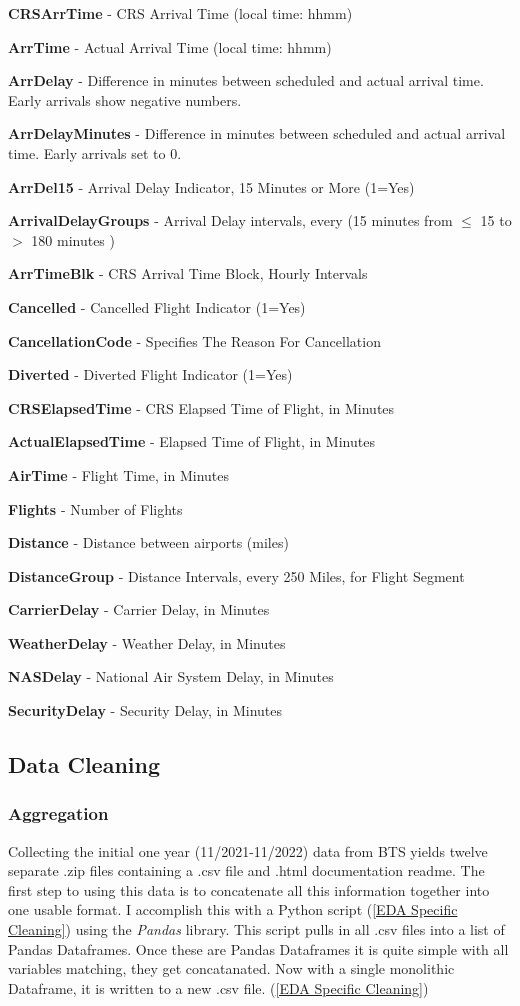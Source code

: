 \documentclass[a4paper,12pt]{article}
\begin{document}
\textbf{CRSArrTime} - CRS Arrival Time (local time: hhmm)

\textbf{ArrTime} - Actual Arrival Time (local time: hhmm)

\textbf{ArrDelay} - Difference in minutes between scheduled and actual arrival time. Early arrivals show negative numbers.

\textbf{ArrDelayMinutes} - Difference in minutes between scheduled and actual arrival time. Early arrivals set to 0.

\textbf{ArrDel15} - Arrival Delay Indicator, 15 Minutes or More (1=Yes)

\textbf{ArrivalDelayGroups} - Arrival Delay intervals, every (15 minutes from $\leq$ 15 to $>$ 180 minutes )

\textbf{ArrTimeBlk} - CRS Arrival Time Block, Hourly Intervals

\textbf{Cancelled} - Cancelled Flight Indicator (1=Yes)

\textbf{CancellationCode} - Specifies The Reason For Cancellation

\textbf{Diverted} - Diverted Flight Indicator (1=Yes)

\textbf{CRSElapsedTime} - CRS Elapsed Time of Flight, in Minutes

\textbf{ActualElapsedTime} - Elapsed Time of Flight, in Minutes

\textbf{AirTime} - Flight Time, in Minutes

\textbf{Flights} - Number of Flights

\textbf{Distance} - Distance between airports (miles)

\textbf{DistanceGroup} - Distance Intervals, every 250 Miles, for Flight Segment

\textbf{CarrierDelay} - Carrier Delay, in Minutes

\textbf{WeatherDelay} - Weather Delay, in Minutes

\textbf{NASDelay} - National Air System Delay, in Minutes

\textbf{SecurityDelay} - Security Delay, in Minutes

\subsection{Data Cleaning}

\subsubsection{Aggregation}
Collecting the initial one year (11/2021-11/2022) data from BTS yields twelve separate .zip files containing a .csv file and .html documentation readme.
The first step to using this data is to concatenate all this information together into one usable format.
I accomplish this with a Python script (\ref{EDA Specific Cleaning}) using the \emph{Pandas} library. This script pulls in all .csv files into a list of Pandas Dataframes.
Once these are Pandas Dataframes it is quite simple with all variables matching, they get concatanated. 
Now with a single monolithic Dataframe, it is written to a new .csv file. (\ref{EDA Specific Cleaning})
\end{document}

